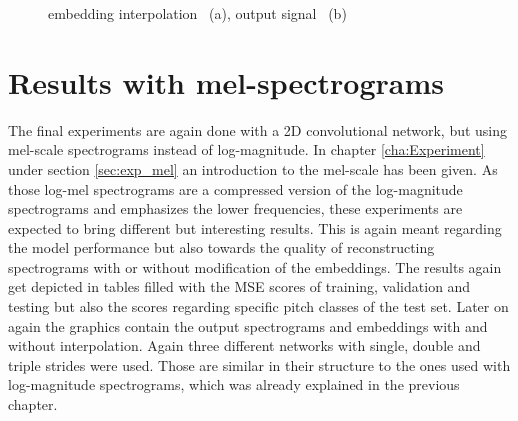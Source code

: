 \begin{figure}[htb!]
    \centering
    \caption{embedding interpolation ~(a), output signal ~(b)}
    \label{fig:res_triple_str_2D_inter_output}
\end{figure}



\section{Results with mel-spectrograms}

The final experiments are again done with a 2D convolutional network, but using mel-scale spectrograms instead of log-magnitude. In chapter \ref{cha:Experiment} under section \ref{sec:exp_mel} an introduction to the mel-scale has been given. As those log-mel spectrograms are a compressed version of the log-magnitude spectrograms and emphasizes the lower frequencies, these experiments are expected to bring different but interesting results. This is again meant regarding the model performance but also towards the quality of reconstructing spectrograms with or without modification of the embeddings. The results again get depicted in tables filled with the MSE scores of training, validation and testing but also the scores regarding specific pitch classes of the test set. Later on again the graphics contain the output spectrograms and embeddings with and without interpolation. Again three different networks with single, double and triple strides were used. Those are similar in their structure to the ones used with log-magnitude spectrograms, which was already explained in the previous chapter.

